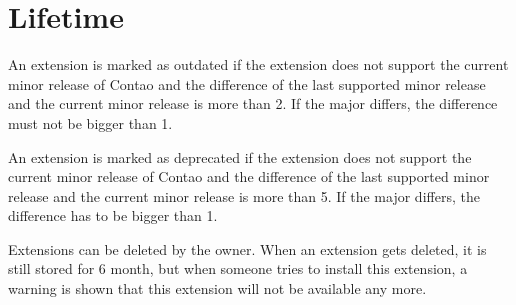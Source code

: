 \section[sec:lifetime]{Lifetime}

An extension is marked as outdated if the extension does not support the current minor release of Contao and the difference of the last supported minor release and the current minor release is more than 2. If the major differs, the difference must not be bigger than 1.

An extension is marked as deprecated if the extension does not support the current minor release of Contao and the difference of the last supported minor release and the current minor release is more than 5. If the major differs, the difference has to be bigger than 1.

Extensions can be deleted by the owner. When an extension gets deleted, it is still stored for 6 month, but when someone tries to install this extension, a warning is shown that this extension will not be available any more.
